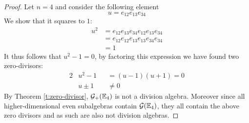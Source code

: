 \begin{proof}
	Let $n = 4$ and consider the following element
	\[u = e_{12}e_{13}e_{34}\]
	We show that it squares to $1$:
	\begin{align*}
		u^2 &= e_{12}e_{13}e_{34}e_{12}e_{13}e_{34}\\
			&= e_{12}e_{12}e_{13}e_{13}e_{34}e_{34}\\
			&= 1
	\end{align*}
	It thus follows that $u^2 - 1 = 0$, by factoring this expression we have found two zero-divisors:
	\begin{alignat*}{2}
		&u^2 - 1 &&= (u-1)(u+1) = 0 \\
		&u \pm 1 &&\neq 0
	\end{alignat*}
	By Theorem \ref{t:zero-divisor}, $\mathcal{G}_+(\mathbb{E}_4)$ is not a division algebra. Moreover since all higher-dimensional even subalgebras contain $\mathcal{G}(\mathbb{E}_4)$, they all contain the above zero divisors and as such are also not division algebras.
\end{proof}
